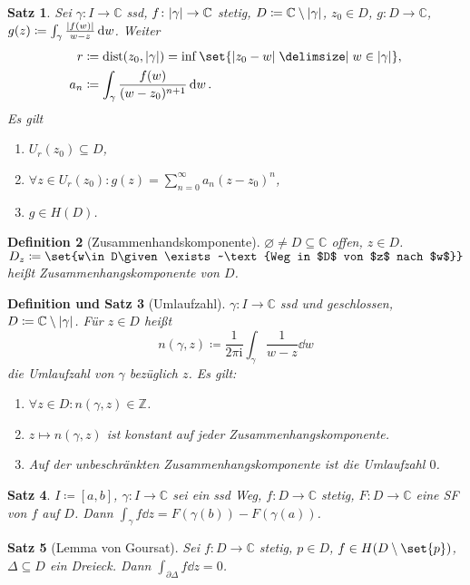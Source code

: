 \documentclass[a4paper]{article}
\newcounter{Sec}
\theoremstyle{marginbreak}
\newtheorem{definition}{Definition}[Sec]
\newtheorem{satz}[definition]{Satz}
\newtheorem{defsatz}[definition]{Definition und Satz}
\newcommand{\C}{\mathbb{C}}
\renewcommand{\i}{\mathrm{i}}
\DeclareMathOperator{\dist}{dist}
\begin{document}
	\begin{satz}
		Sei $\gamma\colon I\to\C$ ssd, $f\colon\abs{\gamma}\to\C$ stetig, $D\coloneqq \C\setminus\abs{\gamma}$,
		$z_0\in D$, $g\colon D\to\C$, $g(z)\coloneqq\int_\gamma\frac{\abs{f(w)}}{w-z}\dd{w}$. Weiter
		\begin{align*}
			r &\coloneqq \dist(z_0,\abs{\gamma}) = \inf\set{\abs{z_0-w}\given w\in\abs{\gamma}},\\
			a_n &\coloneqq \int_\gamma\frac{f(w)}{(w-z_0)^{n+1}}\dd{w}.
		\end{align*}
		Es gilt
		\begin{enumerate}[label=(\alph*)]
			\item $U_r(z_0)\subseteq D$,
			\item $\forall z\in U_r(z_0): g(z)=\sum_{n=0}^\infty a_n(z-z_0)^n$,
			\item $g\in H(D)$.
		\end{enumerate}
	\end{satz}
	\begin{definition}[Zusammenhandskomponente]
		$\varnothing\neq D\subseteq\C$ offen, $z\in D$. $D_z\coloneqq\set{w\in D\given
			\exists~\text{Weg in $D$ von $z$ nach $w$}}$ heißt Zusammenhangskomponente von $D$.
	\end{definition}
	\begin{defsatz}[Umlaufzahl]
		$\gamma\colon I\to\C$ ssd und geschlossen, $D\coloneqq\C\setminus\abs{\gamma}$.
		Für $z\in D$ heißt
		\[
			n(\gamma, z)\coloneqq\frac{1}{2\pi\i}\int_\gamma\frac{1}{w-z}\dd{w}
		\]
		die Umlaufzahl von $\gamma$ bezüglich $z$. Es gilt:
		\begin{enumerate}[label=(\alph*)]
			\item $\forall z\in D: n(\gamma, z)\in\mathbb{Z}$.
			\item $z\mapsto n(\gamma, z)$ ist konstant auf jeder Zusammenhangskomponente.
			\item Auf der unbeschränkten Zusammenhangskomponente ist die Umlaufzahl $0$.
		\end{enumerate}
	\end{defsatz}
	\begin{satz}
		$I\coloneqq [a, b]$, $\gamma\colon I\to\C$ sei ein ssd Weg, $f\colon D\to\C$ stetig,
		$F\colon D\to\C$ eine SF von $f$ auf $D$. Dann $\int_\gamma f\dd{z}=F(\gamma(b))-F(\gamma(a))$.
	\end{satz}
	\begin{satz}[Lemma von Goursat]
		Sei $f\colon D\to\C$ stetig, $p\in D$, $f\in H(D\setminus\set{p})$, $\Delta\subseteq D$ ein Dreieck.
		Dann $\int_{\partial\Delta}f\dd{z}=0$.
	\end{satz}
\end{document}
